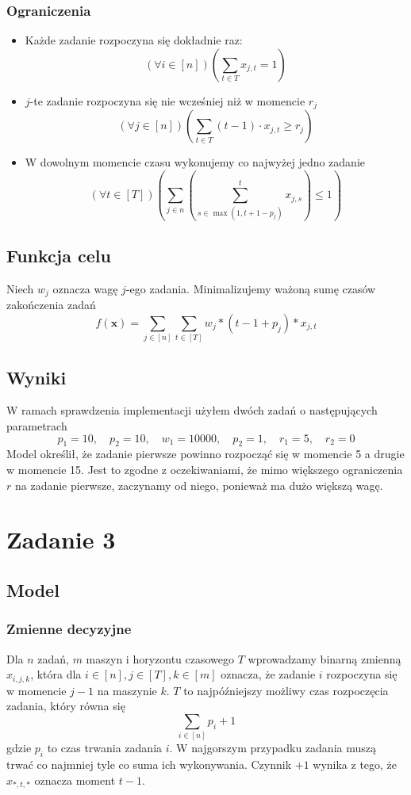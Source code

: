 \documentclass{article}
\def\x{\textbf{x}}
\begin{document}
\subsubsection{Ograniczenia}
\begin{itemize}
\item Każde zadanie rozpoczyna się dokładnie raz:
$$(\forall i \in [n])\left(\sum_{t\in T}x_{j,t}=1\right)$$
\item $j$-te  zadanie rozpoczyna się nie wcześniej niż w momencie $r_j$
$$(\forall j \in [n])\left(\sum_{t\in T}(t-1)\cdot x_{j,t}\geq r_j\right)$$
\item W dowolnym momencie czasu wykonujemy co najwyżej jedno zadanie
$$(\forall t \in [T])\left(\sum_{j\in n} \left(\sum_{s\in \max(1, t+1-p_j)}^t x_{j,s} \right) \leq 1\right)$$
\end{itemize}

\subsection{Funkcja celu}
Niech $w_j$ oznacza wagę $j$-ego zadania. Minimalizujemy ważoną sumę czasów zakończenia zadań
$$f(\x)=\sum_{j \in [n]}\sum_{t\in[T]} w_j * (t-1+p_j) * x_{j,t}$$


\subsection{Wyniki}
W ramach sprawdzenia implementacji użyłem dwóch zadań o następujących parametrach
$$p_1=10,\quad p_2=10,\quad  w_1=10000,\quad  p_2=1,\quad  r_1=5,\quad  r_2=0$$
Model określił, że zadanie pierwsze powinno rozpocząć się w momencie 5 a drugie w momencie 15. Jest to zgodne z oczekiwaniami, że mimo większego ograniczenia $r$ na zadanie pierwsze, zaczynamy od niego, ponieważ ma dużo większą wagę.


\section{Zadanie 3}
\subsection{Model}
\subsubsection{Zmienne decyzyjne}
Dla $n$ zadań, $m$ maszyn i horyzontu czasowego $T$ wprowadzamy binarną zmienną $x_{i,j,k}$, która dla $i\in[n],j\in[T],k\in[m]$ oznacza, że zadanie $i$ rozpoczyna się w momencie $j-1$ na maszynie $k$. $T$ to najpóźniejszy możliwy czas rozpoczęcia zadania, który równa się
$$\sum_{i\in [n]} p_i + 1$$ 
gdzie $p_i$ to czas trwania zadania $i$. W najgorszym przypadku zadania muszą trwać co najmniej tyle co suma ich wykonywania. Czynnik $+1$ wynika z tego, że $x_{*,t,*}$ oznacza moment $t-1$.  
\end{document}
